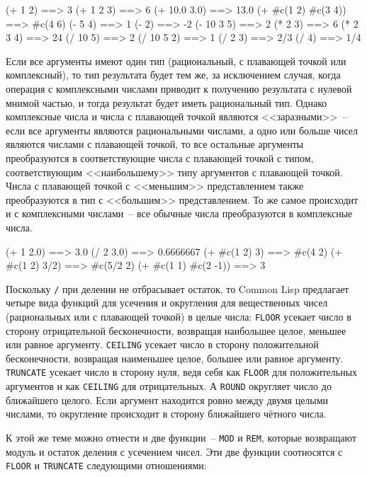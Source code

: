 \begin{myverb}
(+ 1 2)              ==> 3
(+ 1 2 3)            ==> 6
(+ 10.0 3.0)         ==> 13.0
(+ #c(1 2) #c(3 4))  ==> #c(4 6)
(- 5 4)              ==> 1
(- 2)                ==> -2
(- 10 3 5)           ==> 2
(* 2 3)              ==> 6
(* 2 3 4)            ==> 24
(/ 10 5)             ==> 2
(/ 10 5 2)           ==> 1
(/ 2 3)              ==> 2/3
(/ 4)                ==> 1/4
\end{myverb}

Если все аргументы имеют один тип (рациональный, с плавающей точкой или комплексный), то
тип результата будет тем же, за исключением случая, когда операция с комплексными числами приводит
к получению результата с нулевой мнимой частью, и тог\-да результат будет иметь рациональный
тип.  Однако комплексные числа и числа с плавающей точкой являются <<заразными>>~-- если все
аргументы являются рациональными числами, а одно или больше чисел являются числами с
плавающей точкой, то все остальные аргументы преобразуются в соответствующие числа с
плавающей точкой с типом, соответствующим <<наибольшему>> типу аргументов с плавающей
точкой.  Числа с плавающей точкой с <<меньшим>> представлением также преобразуются в тип с
<<большим>> представлением.  То же самое происходит и с комплексными числами~-- все обычные
числа преобразуются в комплексные числа.

\begin{myverb}
(+ 1 2.0)             ==> 3.0
(/ 2 3.0)             ==> 0.6666667
(+ #c(1 2) 3)         ==> #c(4 2)
(+ #c(1 2) 3/2)       ==> #c(5/2 2)
(+ #c(1 1) #c(2 -1))  ==> 3
\end{myverb}

Поскольку \lstinline{/} при делении не отбрасывает остаток, то Common Lisp предлагает четыре
вида функций для усечения и округления для вещественных чисел (рациональных или с
плавающей точкой) в целые числа: \lstinline{FLOOR} усекает число в сторону отрицательной
бесконечности, возвращая наибольшее целое, меньшее или равное аргументу. \lstinline{CEILING}
усекает число в сторону положительной бесконечности, возвращая наименьшее целое, большее
или равное аргументу. \lstinline{TRUNCATE} усекает число в сторону нуля, ведя себя как
\lstinline{FLOOR} для положительных аргументов и как \lstinline{CEILING} для отрицательных.  А
\lstinline{ROUND} округляет число до ближайшего целого. Если аргумент находится ровно между
двумя целыми числами, то округление происходит в сторону ближайшего чётного числа.

К этой же теме можно отнести и две функции~-- \lstinline{MOD} и \lstinline{REM}, которые возвращают
модуль и остаток деления с усечением чисел.  Эти две функции соотносятся с \lstinline{FLOOR} и
\lstinline{TRUNCATE} следующими отношениями:
  
